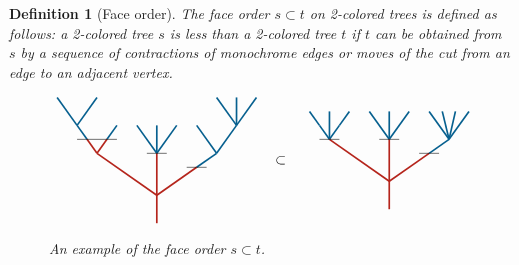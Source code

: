\documentclass[twoside, 12pt]{amsart}
\newtheorem{definition}{Definition}[section]
\theoremstyle{remark}
\begin{document}
\begin{definition}[Face order]\leavevmode
The \emph{face order} $s\subset t$ on 2-colored trees is defined as follows: a 2-colored tree $s$ is less than a 2-colored tree $t$ if $t$ can be obtained from $s$ by a sequence of contractions of monochrome edges or moves of the cut from an edge to an adjacent vertex.

\begin{figure}[h]
\[\vcenter{\hbox{
\begin{tikzpicture}[yscale=0.7,xscale=1]
\draw[very thick, MidnightBlue] (-2.5,3.5)--(-2,2.5);
\draw[very thick, MidnightBlue] (-1.5,3.5)--(-2,2.5);
\draw[very thick, MidnightBlue] (-2,2.5) -- (-1.75,2);
\draw[very thick, MidnightBlue] (-1.25, 2) -- (-1,2.5);
\draw[very thick, MidnightBlue] (-0.5,2.5) -- (0,1.5);
\draw[very thick, MidnightBlue] (0,1.5)--(0,2.5);
\draw[very thick, MidnightBlue] (0,1.5)--(0.5,2.5);
\draw[very thick, MidnightBlue] (1,1)--(1.5,1.5);
\draw[very thick, MidnightBlue] (1.5,1.5)--(1,2.5);
\draw[very thick, MidnightBlue] (1.5,1.5)--(2,2.5);
\draw[very thick, MidnightBlue] (2,2.5)--(1.5,3.5);
\draw[very thick, MidnightBlue] (2,2.5)--(2,3.5);
\draw[very thick, MidnightBlue] (2,2.5)--(2.5,3.5);
\draw[very thick, BrickRed] (0,-1)--(0, 1.5); 
\draw[very thick, BrickRed] (0,0)--(-1.5,1.5);
\draw[very thick, BrickRed] (-1.5,1.5)--(-1.75, 2); 
\draw[very thick, BrickRed] (-1.5,1.5)--(-1.25, 2); 
\draw[very thick, BrickRed] (0,0)--(1, 1);
\draw (-2,2) to (-1,2); 
\draw (-0.25,1.5)-- (0.25, 1.5) ; 
\draw (0.75,1) to (1.25,1);
\end{tikzpicture}}}
\quad \subset \quad
\vcenter{\hbox{
\begin{tikzpicture}[yscale=0.7,xscale=1]
\draw[very thick, MidnightBlue] (-1.5,1.5)--(-1.5,2.5);
\draw[very thick, MidnightBlue] (-2,2.5) -- (-1.75,2);
\draw[very thick, MidnightBlue] (-1.25, 2) -- (-1,2.5);
\draw[very thick, MidnightBlue] (-0.5,2.5) -- (0,1.5);
\draw[very thick, MidnightBlue] (0,1.5)--(0,2.5);
\draw[very thick, MidnightBlue] (0,1.5)--(0.5,2.5);
\draw[very thick, MidnightBlue] (1,1)--(1.5,1.5);
\draw[very thick, MidnightBlue] (1.5,1.5)--(1,2.5);
\draw[very thick, MidnightBlue] (1.5,1.5)--(1.33,2.5);
\draw[very thick, MidnightBlue] (1.5,1.5)--(1.66,2.5);
\draw[very thick, MidnightBlue] (1.5,1.5)--(2,2.5);
\draw[very thick, MidnightBlue] (-1.5,1.5)--(-1.75, 2); 
\draw[very thick, MidnightBlue] (-1.5,1.5)--(-1.25, 2); 
\draw[very thick, BrickRed] (0,-1)--(0, 1.5); 
\draw[very thick, BrickRed] (0,0)--(-1.5,1.5);
\draw[very thick, BrickRed] (0,0)--(1, 1);
\draw (-1.75,1.5) to (-1.25,1.5); 
\draw (-0.25,1.5) to (0.25,1.5); 
\draw (0.75,1) to (1.25,1);
\end{tikzpicture}}}
\]
\caption{An example of the face order $s\subset t$.}
\label{Fig2:InclusionOrder}
\end{figure}

\end{definition}
\end{document}
